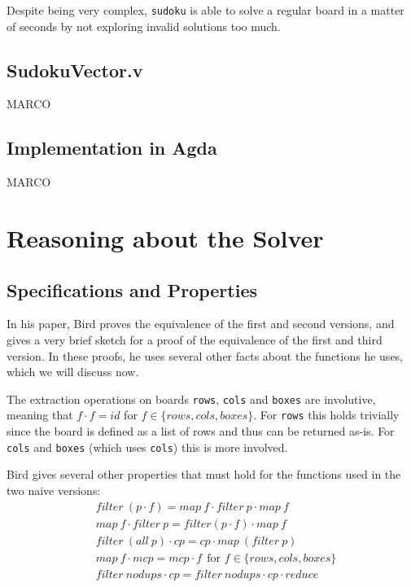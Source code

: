 \documentclass[a4paper,11pt]{article}
\begin{document}
Despite being very complex, \texttt{sudoku} is able to solve a regular board in a matter of seconds by not exploring invalid solutions too much.

\subsection{SudokuVector.v}
MARCO

\subsection{Implementation in Agda}
MARCO

\section{Reasoning about the Solver}
\label{sec:reas}


\subsection{Specifications and Properties}
In his paper, Bird proves the equivalence of the first and second versions, and gives a very brief sketch for a proof of the equivalence of the first and third version. In these proofs, he uses several other facts about the functions he uses, which we will discuss now.
 
The extraction operations on boards \texttt{rows}, \texttt{cols} and \texttt{boxes} are involutive, meaning that \(f \cdot f = id\) for \(f \in \{rows,cols,boxes\}\). For \texttt{rows} this holds trivially since the board is defined as a list of rows and thus can be returned as-is. For \texttt{cols} and \texttt{boxes} (which uses \texttt{cols}) this is more involved. 

Bird gives several other properties that must hold for the functions used in the two naive versions:
\begin{align}
  &filter~(p \cdot f) = map~f \cdot filter~p \cdot map~f\\
  &map~f \cdot filter~p = filter (p \cdot f ) \cdot map~f\\
  &filter~(all~p) \cdot cp = cp \cdot map~(filter~p)\\
  &map~f \cdot mcp = mcp \cdot f~~\text{for \(f \in \{rows,cols,boxes\}\)}\\
  &filter~nodups \cdot cp = filter~nodups \cdot cp \cdot reduce
\end{align}
\end{document}
